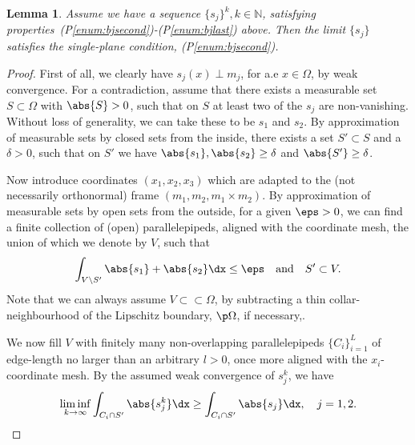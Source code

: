 \documentclass[11pt,reqno]{amsart}
\theoremstyle{plain}
\newtheorem{lemma}[theorem]{Lemma}
\theoremstyle{definition}
\theoremstyle{remark}
\begin{document}
\begin{lemma} \label{lem:main}
Assume we have a sequence $\{s_j\}^k, k\in\mathbb{N}$, satisfying properties~(P\ref{enum:bjsecond})-(P\ref{enum:bjlast}) above. Then the limit $\{s_j\}$ satisfies the single-plane condition, (P\ref{enum:bjsecond}). 
\end{lemma}
\begin{proof}
First of all, we clearly have $s_j(x)\perp m_j$, for a.e  $x\in\Omega$, by weak convergence. For a contradiction, assume that there exists a measurable set $S \subset \Omega$ with $\abs{S}>0$, such that on $S$ at least two of the $s_j$ are non-vanishing. Without loss of generality, we can take these to be $s_1$ and $s_2$. By approximation of measurable sets by closed sets from the inside, there exists a set $S'\subset S$ and a $\delta>0$, such that on $S'$ we have $\abs{s_1}, \abs{s_2} \ge \delta$ and $\abs{S'}\ge \delta$. 

Now introduce coordinates $(x_1,x_2,x_3)$ which are adapted to the (not necessarily orthonormal) frame $(m_1, m_2, m_1\times m_2)$. By approximation of measurable sets by open sets from the outside, for a given $\eps > 0$, we can find a finite collection of (open) parallelepipeds, aligned with the coordinate mesh, the union of which we denote by $V$, such that 
\begin{equation} \label{eq:outer_est}
\int_{V \setminus S'} \abs{s_1}+\abs{s_2}\dx \le \eps\quad \textrm{and} \quad S' \subset V.
\end{equation}
Note that we can always assume $V \subset\subset \Omega$, by subtracting a thin collar-neighbourhood of the Lipschitz boundary, $\p\Omega$, if necessary,.

We now fill $V$ with finitely many non-overlapping parallelepipeds $\{C_i\}_{i=1}^L$ of edge-length no larger than an arbitrary $l>0$, once more aligned with the $x_i$-coordinate mesh. By the assumed weak convergence of $s_j^k$, we have
\begin{equation} \label{eq:moll}
\liminf_{k\to\infty} \int_{C_i\cap S'}  \abs{s_j^k}\dx \ge \int_{C_i\cap S'} \abs{s_j}\dx, \quad j=1,2.
\end{equation}
 

\end{proof}
\end{document}
